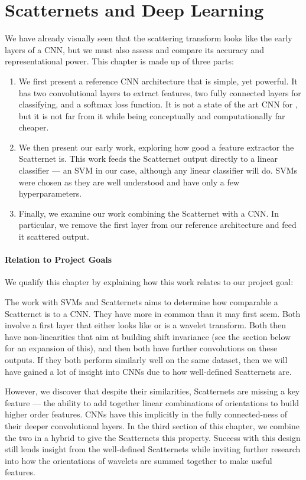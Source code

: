\chapter{Scatternets and Deep Learning}\label{ch:scat_deep}
  We have already visually seen that the scattering transform looks like the
  early layers of a CNN, but we must also assess and compare its accuracy and 
  representational power. This chapter is made up of three parts:
  \begin{enumerate}
    \item We first present a reference CNN architecture that is simple, yet
      powerful. It has two convolutional layers to extract features, two fully
      connected layers for classifying, and a softmax loss function. It is not
      a state of the art CNN for \cifar, but it is not far from it while being
      conceptually and computationally far cheaper.
    \item We then present our early work, exploring how good a feature extractor
      the Scatternet is. This work feeds the Scatternet output directly to
      a linear classifier --- an SVM in our case, although any linear classifier
      will do. SVMs were chosen as they are well understood and have only a few
      hyperparameters.
    \item Finally, we examine our work combining the Scatternet with a CNN\@. In
      particular, we remove the first layer from our reference architecture and
      feed it scattered output.
  \end{enumerate}
  
  \subsubsection{Relation to Project Goals}
  We qualify this chapter by explaining how this work relates to our project goal:

  The work with SVMs and Scatternets aims to determine how comparable
  a Scatternet is to a CNN\@. They have more in common than it may first seem.
  Both involve a first layer that either looks like or is a wavelet transform.
  Both then have non-linearities that aim at building shift invariance (see the
  section below for an expansion of this), and
  then both have further convolutions on these outputs. If they both perform
  similarly well on the same dataset, then we will have gained a lot of insight
  into CNNs due to how well-defined Scatternets are.

  However, we discover that despite their similarities, Scatternets are missing
  a key feature --- the ability to add together linear combinations of
  orientations to build higher order features. CNNs have this implicitly in
  the fully connected-ness of their deeper convolutional layers. In the third
  section of this chapter, we combine the two in a hybrid to give the
  Scatternets this property. Success with this design still lends insight from
  the well-defined Scatternets while inviting further research into how the
  orientations of wavelets are summed together to make useful features. 

